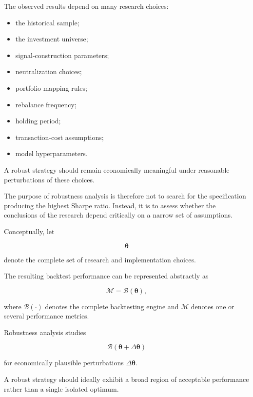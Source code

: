 \documentclass[11pt,a4paper]{article}
\begin{document}
The observed results depend on many research choices:

\begin{itemize}
    \item the historical sample;
    \item the investment universe;
    \item signal-construction parameters;
    \item neutralization choices;
    \item portfolio mapping rules;
    \item rebalance frequency;
    \item holding period;
    \item transaction-cost assumptions;
    \item model hyperparameters.
\end{itemize}

A robust strategy should remain economically meaningful under reasonable
perturbations of these choices.

The purpose of robustness analysis is therefore not to search for the
specification producing the highest Sharpe ratio. Instead, it is to assess
whether the conclusions of the research depend critically on a narrow set of
assumptions.

Conceptually, let

\begin{equation}
\boldsymbol{\theta}
\end{equation}

denote the complete set of research and implementation choices.

The resulting backtest performance can be represented abstractly as

\begin{equation}
\boxed{
\mathcal{M}
=
\mathcal{B}
\left(
\boldsymbol{\theta}
\right),
}
\end{equation}

where $\mathcal{B}(\cdot)$ denotes the complete backtesting engine and
$\mathcal{M}$ denotes one or several performance metrics.

Robustness analysis studies

\begin{equation}
\boxed{
\mathcal{B}
\left(
\boldsymbol{\theta}
+
\Delta\boldsymbol{\theta}
\right)
}
\end{equation}

for economically plausible perturbations
$\Delta\boldsymbol{\theta}$.

A robust strategy should ideally exhibit a broad region of acceptable
performance rather than a single isolated optimum.
\end{document}

